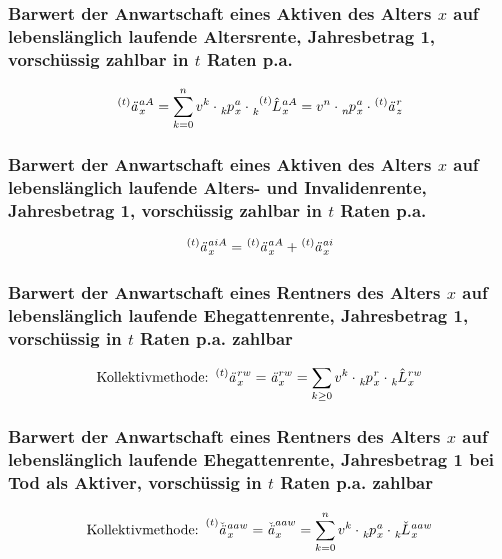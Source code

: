 \documentclass[12pt]{report}
\theoremstyle{dotless}
\theoremstyle{definition}
\begin{document}
\subsubsection{Barwert der Anwartschaft eines Aktiven des Alters $x$ auf lebenslänglich laufende Altersrente, Jahresbetrag 1, vorschüssig zahlbar in $t$ Raten p.a.}
\begin{equation}
	\tensor[^{(t)}]{\text{\textit{ä}}}{}_x^{aA}=\sum_{k = 0}^n v^k \cdot \tensor[_{k}]{p}{}_x^a \cdot  \tensor[_{k}^{(t)}]{\hat{L}}{}_x^{aA} = v^n \cdot \tensor[_{n}]{p}{}_x^a \cdot \tensor[^{(t)}]{\text{\textit{ä}}}{}_z^{r}
\end{equation}

\subsubsection{Barwert der Anwartschaft eines Aktiven des Alters $x$ auf lebenslänglich laufende Alters- und Invalidenrente, Jahresbetrag 1, vorschüssig zahlbar in $t$ Raten p.a.}
\begin{equation}
	\tensor[^{(t)}]{\text{\textit{ä}}}{}_x^{aiA} = \tensor[^{(t)}]{\text{\textit{ä}}}{}_x^{aA} +\tensor[^{(t)}]{\text{\textit{ä}}}{}_x^{ai}
\end{equation}

\subsubsection{Barwert der Anwartschaft eines Rentners des Alters $x$ auf lebenslänglich laufende Ehegattenrente, Jahresbetrag 1, vorschüssig in $t$ Raten p.a. zahlbar}
\begin{equation}
	\text{Kollektivmethode: } \tensor[^{(t)}]{\text{\textit{ä}}}{}_x^{rw}=\text{\textit{ä}}_x^{rw}=\sum_{k \geq 0} v^k \cdot \tensor[_{k}]{p}{}_x^r \cdot  \tensor[_{k}]{\hat{L}}{}_x^{rw}
\end{equation}

\subsubsection{Barwert der Anwartschaft eines Rentners des Alters $x$ auf lebenslänglich laufende Ehegattenrente, Jahresbetrag 1 bei Tod als Aktiver, vorschüssig in $t$ Raten p.a. zahlbar}
\begin{equation}
	\text{Kollektivmethode: } \tensor[^{(t)}]{\check{\text{\textit{ä}}}}{}_x^{aaw}=\check{\text{\textit{ä}}}_x^{aaw}=\sum_{k = 0}^n v^k \cdot \tensor[_{k}]{p}{}_x^a \cdot  \tensor[_{k}]{\check{L}}{}_x^{aaw}
\end{equation}
\end{document}
